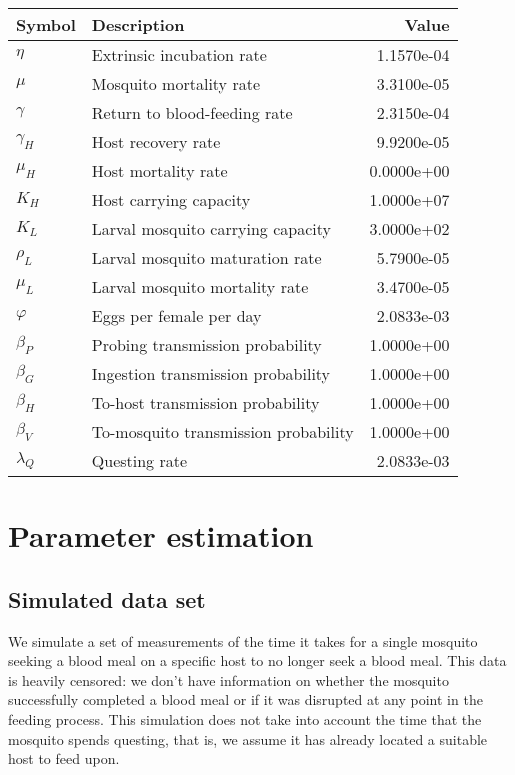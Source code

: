 \documentclass[
]{article}
\begin{document}
\begin{longtable}[]{@{}llr@{}}
\toprule\noalign{}
Symbol & Description & Value \\
\midrule\noalign{}
\endhead
\bottomrule\noalign{}
\endlastfoot
\(\eta\) & Extrinsic incubation rate & 1.1570e-04 \\
\(\mu\) & Mosquito mortality rate & 3.3100e-05 \\
\(\gamma\) & Return to blood-feeding rate & 2.3150e-04 \\
\(\gamma_H\) & Host recovery rate & 9.9200e-05 \\
\(\mu_H\) & Host mortality rate & 0.0000e+00 \\
\(K_H\) & Host carrying capacity & 1.0000e+07 \\
\(K_L\) & Larval mosquito carrying capacity & 3.0000e+02 \\
\(\rho_L\) & Larval mosquito maturation rate & 5.7900e-05 \\
\(\mu_L\) & Larval mosquito mortality rate & 3.4700e-05 \\
\(\varphi\) & Eggs per female per day & 2.0833e-03 \\
\(\beta_P\) & Probing transmission probability & 1.0000e+00 \\
\(\beta_G\) & Ingestion transmission probability & 1.0000e+00 \\
\(\beta_H\) & To-host transmission probability & 1.0000e+00 \\
\(\beta_V\) & To-mosquito transmission probability & 1.0000e+00 \\
\(\lambda_Q\) & Questing rate & 2.0833e-03 \\
\end{longtable}

\hypertarget{parameter-estimation}{%
\section{Parameter estimation}\label{parameter-estimation}}

\hypertarget{simulated-data-set}{%
\subsection{Simulated data set}\label{simulated-data-set}}

We simulate a set of measurements of the time it takes for a single
mosquito seeking a blood meal on a specific host to no longer seek a
blood meal. This data is heavily censored: we don't have information on
whether the mosquito successfully completed a blood meal or if it was
disrupted at any point in the feeding process. This simulation does not
take into account the time that the mosquito spends questing, that is,
we assume it has already located a suitable host to feed upon.
\end{document}

